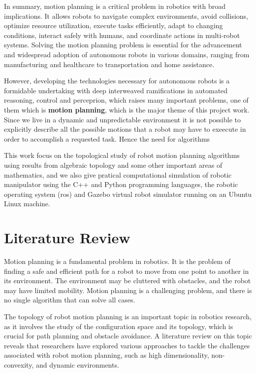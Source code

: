 In summary, motion planning is a critical problem in robotics with broad implications. It allows robots to navigate complex environments, avoid collisions, optimize resource utilization, execute tasks efficiently, adapt to changing conditions, interact safely with humans, and coordinate actions in multi-robot systems. Solving the motion planning problem is essential for the advancement and widespread adoption of autonomous robots in various domains, ranging from manufacturing and healthcare to transportation and home assistance.

However, developing the technologies necessary for autonomous robots is a formidable undertaking with deep interweaved ramifications in automated reasoning, control and perceprion, which raises many important problems, one of them which is \textbf{motion planning}, which is the major theme of this project work. Since we live in a dynamic and unpredictable environment it is not possible to explicitly describe all the possible motions that a robot may have to exeecute in order to accomplish a requested task. Hence the need for algorithms

This work focus on the topological study of robot motion planning algorithms using results from algebraic topology and some other important areas of mathematics, and we also give pratical computational simulation of robotic manipulator using the C++ and Python programming languages, the robotic operating system (ros) and Gazebo virtual robot simulator running on an Ubuntu Linux machine.

\section{Literature Review}
Motion planning is a fundamental problem in robotics. It is the problem of finding a safe and efficient path for a robot to move from one point to another in its environment. The environment may be cluttered with obstacles, and the robot may have limited mobility. Motion planning is a challenging problem, and there is no single algorithm that can solve all cases.

The topology of robot motion planning is an important topic in robotics research, as it involves the study of the configuration space and its topology, which is crucial for path planning and obstacle avoidance. A literature review on this topic reveals that researchers have explored various approaches to tackle the challenges associated with robot motion planning, such as high dimensionality, non-convexity, and dynamic environments.

